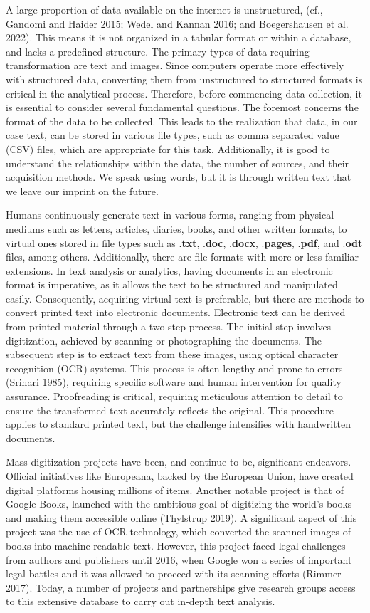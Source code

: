 A large proportion of data available on the internet is unstructured,
(cf., Gandomi and Haider 2015; Wedel and Kannan 2016; and Boegershausen
et al. 2022). This means it is not organized in a tabular format or
within a database, and lacks a predefined structure. The primary types of
data requiring transformation are text and images. Since computers
operate more effectively with structured data, converting them from
unstructured to structured formats is critical in the analytical
process. Therefore, before commencing data collection, it is essential
to consider several fundamental questions. The foremost concerns the format of the data to be collected. This leads to the
realization that data, in our case text, can be stored in various file
types, such as comma separated value (CSV) files, which are appropriate for
this task. Additionally, it is good to understand the relationships
within the data, the number of sources, and their acquisition methods.
We speak using words, but it is through written text that we leave
our imprint on the future.

Humans continuously generate text in various forms, ranging from
physical mediums such as letters, articles, diaries, books, and other
written formats, to virtual ones stored in file types such as
.\textbf{txt}, .\textbf{doc}, .\textbf{docx}, .\textbf{pages},
.\textbf{pdf}, and .\textbf{odt} files, among others. Additionally, there are file
formats with more or less familiar extensions. In text analysis or
analytics, having documents in an electronic format is imperative, as it
allows the text to be structured and manipulated easily. Consequently, acquiring
virtual text is preferable, but there are methods to convert printed
text into electronic documents. Electronic text can be derived from
printed material through a two-step process. The initial step involves
digitization, achieved by scanning or photographing the documents. The
subsequent step is to extract text from these images, using
optical character recognition (OCR) systems. This process is often
lengthy and prone to errors (Srihari 1985), requiring specific
software and human intervention for quality assurance. Proofreading is
critical, requiring meticulous attention to detail to ensure the transformed text
accurately reflects the original. This procedure applies to
standard printed text, but the challenge intensifies with handwritten
documents.

Mass digitization projects have been, and continue to be, significant
endeavors. Official initiatives like Europeana, backed by the European
Union, have created digital platforms housing millions of items. Another notable project is that of
Google Books, launched with the ambitious goal of digitizing
the world's books and making them accessible online (Thylstrup 2019). A
significant aspect of this project was the use of OCR technology, which converted the scanned images of
books into machine-readable text. However, this project faced legal
challenges from authors and publishers until 2016, when Google won a series of important legal battles and it was allowed to proceed with
its scanning efforts (Rimmer 2017). Today, a number of projects and
partnerships give research groups access to this extensive database
to carry out in-depth text analysis.

